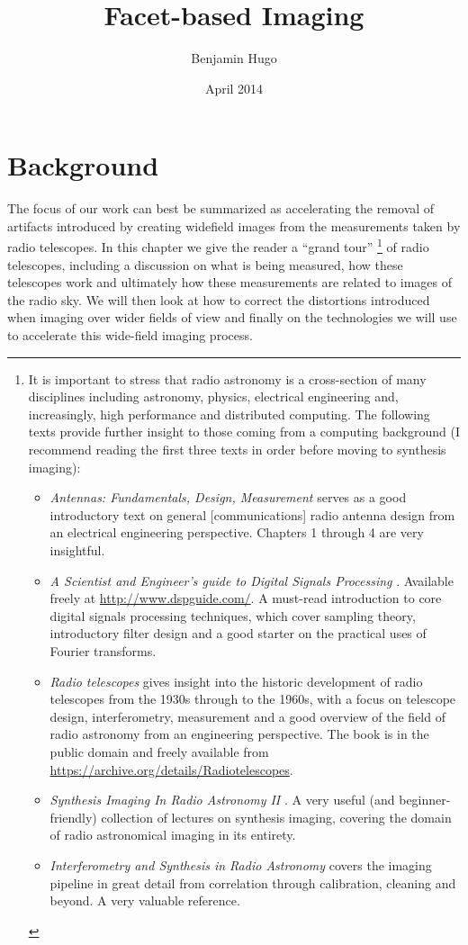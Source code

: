 \documentclass[a4paper,10pt]{report}
\title{Facet-based Imaging}
\author{Benjamin Hugo}
\date{April 2014}
\begin{document}
\maketitle
\tableofcontents
\chapter{Background}
The focus of our work can best be summarized as accelerating the removal of artifacts introduced by creating widefield images from the measurements taken by radio telescopes. 
In this chapter we give the reader a ``grand tour'' \footnote{It is important to stress that radio astronomy is a cross-section of many disciplines including astronomy, physics, 
electrical engineering and, increasingly, high performance and distributed computing. The following texts provide further insight to those coming from a computing background (I recommend 
reading the first three texts in order before moving to synthesis imaging):
\begin{itemize}
 \item \textit{Antennas: Fundamentals, Design, Measurement} \cite{blake2009antennas} serves as a good introductory text on general [communications] radio antenna design from an electrical engineering perspective. Chapters 1 through 4
 are very insightful.
 \item \textit{A Scientist and Engineer's guide to Digital Signals Processing} \cite{smith1997scientist}. Available freely at \url{http://www.dspguide.com/}. A must-read introduction to core digital 
 signals processing techniques, which cover sampling theory, introductory filter design and a good starter on the practical uses of Fourier transforms.
 \item \textit{Radio telescopes} \cite{christiansenradiotelescopes} gives insight into the historic development of radio telescopes from the 1930s through to the 1960s, with a focus on telescope design, interferometry, measurement and a 
 good overview of the field of radio astronomy from an engineering perspective. The book is in the public domain and freely available from \url{https://archive.org/details/Radiotelescopes}.
 \item \textit{Synthesis Imaging In Radio Astronomy II} \cite{taylor1999synthesis}. A very useful (and beginner-friendly) collection of lectures on synthesis imaging, covering the domain of radio astronomical imaging 
 in its entirety.
 \item \textit{Interferometry and Synthesis in Radio Astronomy} \cite{thompson2008interferometry} covers the imaging pipeline in great detail from correlation through calibration, cleaning
 and beyond. A very valuable reference.
\end{itemize}
} of radio telescopes, including a discussion on what is being measured, how these telescopes work and ultimately how these 
measurements are related to images of the radio sky. We will then look at how to correct the distortions introduced when imaging over wider fields of view and finally on 
the technologies we will use to accelerate this wide-field imaging process.
\end{document}
